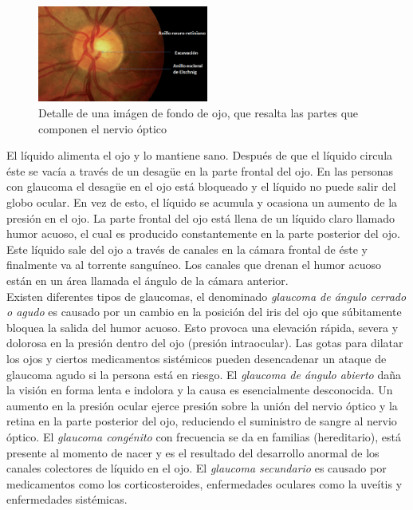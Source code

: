 \begin{description}
\begin{figure}[H]
	{
	\centering
	\includegraphics[width=0.5\textwidth]{Figures/nervioOptico}
	\caption[Glaucoma]{Detalle de una im\'agen de fondo de ojo, que resalta las partes que componen el nervio \'optico}
	\label{fig:Glaucoma}
	}
\end{figure}
El l\'iquido alimenta el ojo y lo mantiene sano. Despu\'es de que el l\'iquido circula \'este se vac\'ia a trav\'es de un desagüe en la parte frontal del ojo. En las personas con glaucoma el desagüe en el ojo est\'a bloqueado y el l\'iquido no puede salir del globo ocular. En vez de esto, el l\'iquido se acumula y ocasiona un aumento de la presi\'on en el ojo. 
La parte frontal del ojo est\'a llena de un l\'iquido claro llamado humor acuoso, el cual es producido constantemente en la parte posterior del ojo. Este l\'iquido sale del ojo a trav\'es de canales en la c\'amara frontal de \'este y finalmente va al torrente sangu\'ineo. Los canales que drenan el humor acuoso est\'an en un \'area llamada el \'angulo de la c\'amara anterior.\\
Existen diferentes tipos de glaucomas, el denominado \textit{glaucoma de \'angulo cerrado o agudo} es causado por un cambio en la posici\'on del iris del ojo que s\'ubitamente bloquea la salida del humor acuoso. Esto provoca una elevaci\'on r\'apida, severa y dolorosa en la presi\'on dentro del ojo (presi\'on intraocular). Las gotas para dilatar los ojos y ciertos medicamentos sist\'emicos pueden desencadenar un ataque de glaucoma agudo si la persona est\'a en riesgo. El \textit{glaucoma de \'angulo abierto} da\~na la visi\'on en forma lenta e indolora y la causa es esencialmente desconocida. Un aumento en la presi\'on ocular ejerce presi\'on sobre la uni\'on del nervio \'optico y la retina en la parte posterior del ojo, reduciendo el suministro de sangre al nervio \'optico. El \textit{glaucoma cong\'enito} con frecuencia se da en familias (hereditario), est\'a presente al momento de nacer y es el resultado del desarrollo anormal de los canales colectores de l\'iquido en el ojo. El \textit{glaucoma secundario} es causado por medicamentos como los corticosteroides, enfermedades oculares como la uve\'itis y enfermedades sist\'emicas. \cite{tielsch1991population}


\end{description}

